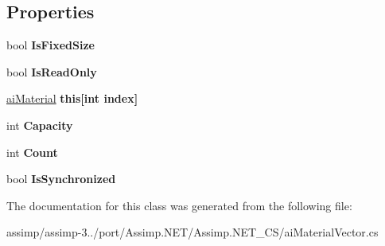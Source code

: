 \subsection*{Properties}
\begin{DoxyCompactItemize}
\item 
\hypertarget{classai_material_vector_a0e2b5850ab40f661b79a6fa6f79b90f6}{bool {\bfseries Is\+Fixed\+Size}}\label{classai_material_vector_a0e2b5850ab40f661b79a6fa6f79b90f6}

\item 
\hypertarget{classai_material_vector_a51d072ccd806f950663b24290f328469}{bool {\bfseries Is\+Read\+Only}}\label{classai_material_vector_a51d072ccd806f950663b24290f328469}

\item 
\hypertarget{classai_material_vector_aa40e17c1b77bd739b102c87dad55961d}{\hyperlink{classai_material}{ai\+Material} {\bfseries this\mbox{[}int index\mbox{]}}}\label{classai_material_vector_aa40e17c1b77bd739b102c87dad55961d}

\item 
\hypertarget{classai_material_vector_a25b6e5f0435e086a761a972caab86d17}{int {\bfseries Capacity}}\label{classai_material_vector_a25b6e5f0435e086a761a972caab86d17}

\item 
\hypertarget{classai_material_vector_ab4e847097ddf195842dd847dae67d3b0}{int {\bfseries Count}}\label{classai_material_vector_ab4e847097ddf195842dd847dae67d3b0}

\item 
\hypertarget{classai_material_vector_a7e6f6ff5147a35318e9b165553875e5d}{bool {\bfseries Is\+Synchronized}}\label{classai_material_vector_a7e6f6ff5147a35318e9b165553875e5d}

\end{DoxyCompactItemize}


The documentation for this class was generated from the following file\+:\begin{DoxyCompactItemize}
\item 
assimp/assimp-\/3../port/\+Assimp.\+N\+E\+T/\+Assimp.\+N\+E\+T\+\_\+\+C\+S/ai\+Material\+Vector.\+cs\end{DoxyCompactItemize}
